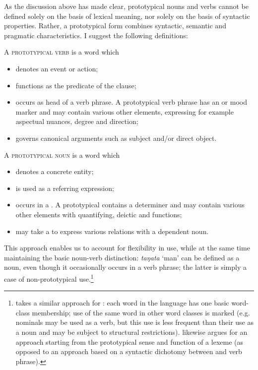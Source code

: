 As the discussion above has made clear, prototypical nouns and verbs cannot be defined solely on the basis of lexical meaning, nor solely on the basis of syntactic properties. Rather, a prototypical form combines syntactic, semantic and pragmatic characteristics. I suggest the following definitions:

A \textsc{prototypical}\textsc{ verb} is a word which

\begin{itemize}
\item 
denotes an event or action;

\item 
functions as the predicate of the clause;

\item 
occurs as head of a verb phrase. A prototypical verb phrase has an  or mood marker and may contain various other elements, expressing for example aspectual nuances, degree and direction;

\item 
governs canonical arguments such as subject and/or direct object.

\end{itemize}

A \textsc{prototypical}\textsc{ noun} is a word which

\begin{itemize}
\item 
denotes a concrete entity;

\item 
is used as a referring expression;

\item 
occurs in a . A prototypical  contains a determiner and may contain various other elements with quantifying, deictic and  functions;

\item 
may take a  to express various relations with a dependent noun.

\end{itemize}

This approach enables us to account for flexibility in use, while at the same time maintaining the basic noun-verb distinction: \textit{taŋata} ‘man’ can be defined as a noun, even though it occasionally occurs in a verb phrase; the latter is simply a case of non-prototypical use.\footnote{\label{fn:96}\citet[257]{Besnier2000} takes a similar approach for : each word in the language has one basic word-class membership; use of the same word in other word classes is marked (e.g. nominals may be used as a verb, but this use is less frequent than their use as a noun and may be subject to structural restrictions). \citet[184]{Moyse-Faurie2005} likewise argues for an approach starting from the prototypical sense and function of a lexeme (as opposed to an approach based on a syntactic dichotomy between  and verb phrase).}


